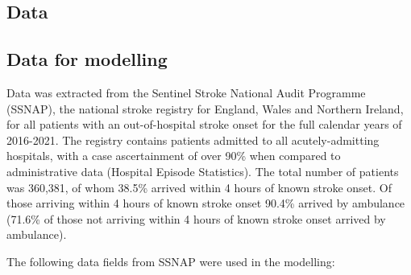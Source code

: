 \subsection{Data}

\subsection{Data for modelling}

Data was extracted from the Sentinel Stroke National Audit Programme (SSNAP), the national stroke registry for England, Wales and Northern Ireland, for all patients with an out-of-hospital stroke onset for the full calendar years of 2016-2021. The registry contains  patients admitted to all acutely-admitting hospitals, with a case ascertainment of over 90\% when compared to administrative data (Hospital Episode Statistics). The total number of patients was 360,381, of whom 38.5\% arrived within 4 hours of known stroke onset. Of those arriving within 4 hours of known stroke onset 90.4\% arrived by ambulance (71.6\% of those not arriving within 4 hours of known stroke onset arrived by ambulance).

The following data fields from SSNAP were used in the modelling:

